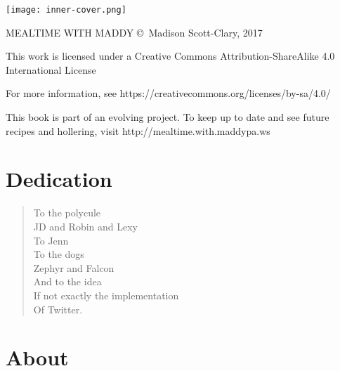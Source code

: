 \documentclass{memoir}
\begin{document}
\frontmatter

\pagestyle{empty}
\texttt{[image: inner-cover.png]}
\newpage

\null
\vfill

\titlefont MEALTIME WITH MADDY \copyright\ Madison Scott-Clary, 2017

\vspace{1ex}

This work is licensed under a Creative Commons Attribution-ShareAlike 4.0 International License

\vspace{1ex}

For more information, see \mbox{\urlfont https://creativecommons.org/licenses/by-sa/4.0/}

\vspace{1cm}

This book is part of an evolving project. To keep up to date and see future recipes and hollering, visit \mbox{\urlfont http://mealtime.with.maddypa.ws}

\vfill
\newpage

\pagestyle{fancyplain}
\tableofcontents*

\normalfont

\chapter*{Dedication}

\begin{verse}
  To the polycule\\
  \vin JD and Robin and Lexy\\
  To Jenn\\
  To the dogs\\
  \vin Zephyr and Falcon\\
  And to the idea\\
  \vin If not exactly the implementation\\
  \vin \vin Of Twitter.
\end{verse}

\chapter[About]{About}

\mainmatter








\end{document}
